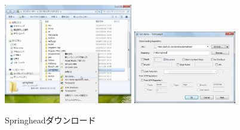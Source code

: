 \begin{narrow}[15pt]
	\begin{figure}[h]
	\begin{center}
	\includegraphics[width=0.5\textwidth]{fig/SpringheadClone1.eps}
	\includegraphics[width=0.4\textwidth]{fig/SpringheadClone2.eps}
	\end{center}
	\caption{Springheadダウンロード}
	\label{fig:SpringheadClone}
	\end{figure}
\end{narrow}

